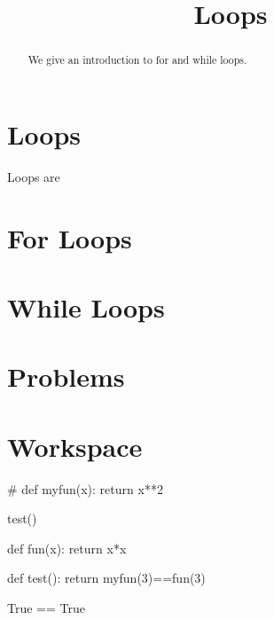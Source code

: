 \documentclass{ximera}
\title{Loops}
\begin{document}
  
\begin{abstract}  
We give an introduction to for and while loops.
\end{abstract}  
\maketitle

\section{Loops}

Loops are 

\section{For Loops}

\section{While Loops}

\section{Problems}

\begin{question}
\end{question}

\begin{question}
\end{question}

\section{Workspace}


\begin{sageCell}
#
def myfun(x):
        return x**2

test()
\end{sageCell}

\begin{expandable}
\begin{sageOutput}
def fun(x):
        return x*x

def test():
	return myfun(3)==fun(3)

True == True
\end{sageOutput}
\end{expandable}
\end{document}

